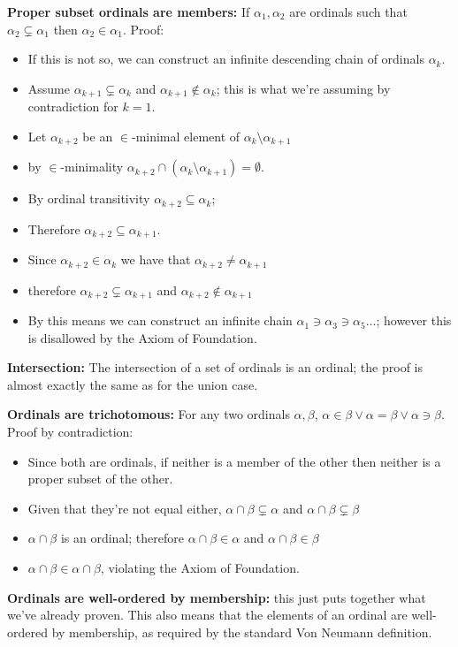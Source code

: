 \documentclass{article}
\begin{document}
\textbf{Proper subset ordinals are members:} If $\alpha_1, \alpha_2$ are ordinals such that $\alpha_2 \subsetneq \alpha_1$ then $\alpha_2 \in \alpha_1$. Proof: 
\begin{itemize}
\item If this is not so, we can construct an infinite descending chain of ordinals $\alpha_k$.
\item Assume $\alpha_{k+1} \subsetneq \alpha_k$ and $\alpha_{k+1} \not\in \alpha_k$; this is what we're assuming by contradiction for $k=1$.
\item Let $\alpha_{k+2}$ be an $\in$-minimal element of $\alpha_k \setminus \alpha_{k+1}$
\item by $\in$-minimality $\alpha_{k+2} \cap (\alpha_k \setminus \alpha_{k+1}) = \emptyset$.
\item By ordinal transitivity $\alpha_{k+2} \subseteq \alpha_k$; 
\item Therefore $\alpha_{k+2} \subseteq \alpha_{k+1}$.
\item Since $\alpha_{k+2} \in \alpha_k$ we have that $\alpha_{k+2} \neq \alpha_{k+1}$
\item therefore $\alpha_{k+2} \subsetneq \alpha_{k+1}$ and $\alpha_{k+2} \not\in \alpha_{k+1}$
\item By this means we can construct an infinite chain $\alpha_1 \ni \alpha_3 \ni \alpha_5 \ldots$; however this is disallowed by the Axiom of Foundation.
\end{itemize}

\textbf{Intersection:} The intersection of a set of ordinals is an ordinal; the proof is almost exactly the same as for the union case.

\textbf{Ordinals are trichotomous:} For any two ordinals $\alpha, \beta$, $\alpha \in \beta \vee \alpha = \beta \vee \alpha \ni \beta$. Proof by contradiction: 
\begin{itemize}
\item Since both are ordinals, if neither is a member of the other then neither is a proper subset of the other.
\item Given that they're not equal either, $\alpha \cap \beta \subsetneq \alpha$ and $\alpha \cap \beta \subsetneq \beta$
\item $\alpha \cap \beta$ is an ordinal; therefore $\alpha \cap \beta \in \alpha$ and $\alpha \cap \beta \in \beta$
\item $\alpha \cap \beta \in \alpha \cap \beta$, violating the Axiom of Foundation.
\end{itemize}

\textbf{Ordinals are well-ordered by membership:} this just puts together what we've already proven. This also means that the elements of an ordinal are well-ordered by membership, as required by the standard Von Neumann definition.
\end{document}
